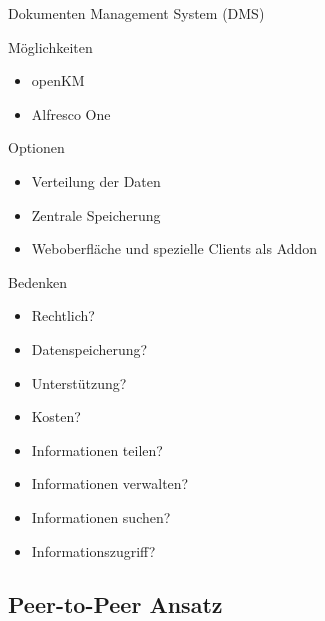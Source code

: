 \documentclass{beamer}
\begin{document}
\begin{frame}[shrink]{Dokumenten Management System (DMS)}
	
	\begin{block}{Möglichkeiten}
		\begin{itemize}
			\item openKM 
			\item Alfresco One
		\end{itemize}
		
	\end{block}
	
	\begin{block}{Optionen}
		\begin{itemize}
			\item Verteilung der Daten
			\item Zentrale Speicherung
			\item Weboberfläche und spezielle Clients als Addon
		\end{itemize}
		
		
	\end{block}
	
	
	\begin{block}{Bedenken}
		\begin{multicols}{2}
		\begin{itemize}
			\item Rechtlich? 
			\item Datenspeicherung?
			\item Unterstützung?
			\item Kosten?
			\item Informationen teilen?
			\item Informationen verwalten?
			\item Informationen suchen?
			\item Informationszugriff?
			\end{itemize}		
		\end{multicols}
	\end{block}
	
	\bigskip
	
\end{frame}



\subsection{Peer-to-Peer Ansatz}
\end{document}
